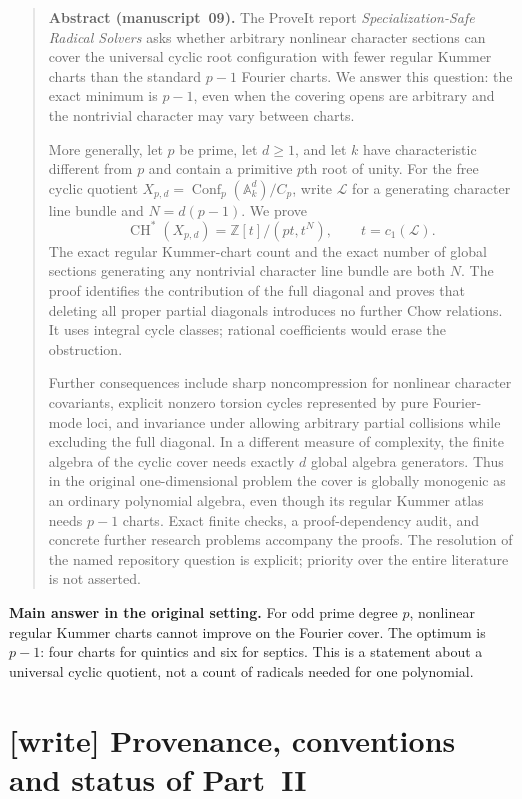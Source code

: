\documentclass[11pt,a4paper]{article}
\theoremstyle{definition}
\theoremstyle{remark}
\newcommand{\Z}{\mathbb Z}
\newcommand{\A}{\mathbb A}
\newcommand{\LL}{\mathcal L}
\newcommand{\CH}{\operatorname{CH}}
\newcommand{\Conf}{\operatorname{Conf}}
\begin{document}
\begin{quote}\small
\textbf{Abstract (manuscript~09).}
The ProveIt report \emph{Specialization-Safe Radical Solvers} asks whether
arbitrary nonlinear character sections can cover the universal cyclic
root configuration with fewer regular Kummer charts than the standard
$p-1$ Fourier charts. We answer this question: the exact minimum is
$p-1$, even when the covering opens are arbitrary and the nontrivial
character may vary between charts.

More generally, let $p$ be prime, let $d\geq1$, and let $k$ have
characteristic different from $p$ and contain a primitive $p$th root of
unity. For the free cyclic quotient
$X_{p,d}=\Conf_p(\A_k^d)/C_p$, write $\LL$ for a generating character
line bundle and $N=d(p-1)$. We prove
\[
 \CH^*(X_{p,d})=\Z[t]/(pt,t^N),\qquad t=c_1(\LL).
\]
The exact regular Kummer-chart count and the exact number of global
sections generating any nontrivial character line bundle are both $N$.
The proof identifies the contribution of the full diagonal and proves
that deleting all proper partial diagonals introduces no further Chow
relations. It uses integral cycle classes; rational coefficients would
erase the obstruction.

Further consequences include sharp noncompression for nonlinear
character covariants, explicit nonzero torsion cycles represented by
pure Fourier-mode loci, and invariance under allowing arbitrary partial
collisions while excluding the full diagonal. In a different measure of
complexity, the finite algebra of the cyclic cover needs exactly $d$
global algebra generators. Thus in the original one-dimensional problem
the cover is globally monogenic as an ordinary polynomial algebra, even
though its regular Kummer atlas needs $p-1$ charts. Exact finite checks,
a proof-dependency audit, and concrete further research problems accompany
the proofs. The resolution of the named repository question is explicit;
priority over the entire literature is not asserted.
\end{quote}

\noindent\textbf{Main answer in the original setting.}
For odd prime degree $p$, nonlinear regular Kummer charts cannot improve
on the Fourier cover. The optimum is $p-1$: four charts for quintics and
six for septics. This is a statement about a universal cyclic quotient,
not a count of radicals needed for one polynomial.

\section{[write] Provenance, conventions and status of Part~II}
\label{ka:sec:write}
\end{document}
